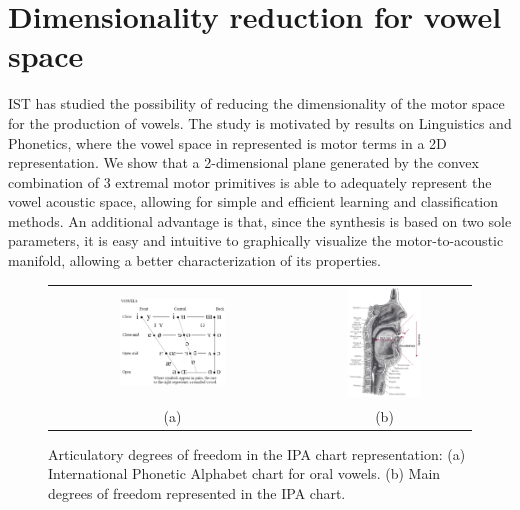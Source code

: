 \section{Dimensionality reduction for vowel space}
IST has studied the possibility of reducing the dimensionality of the
motor space for the production of vowels. The study is motivated by results on Linguistics and
Phonetics, where the vowel space in represented is motor terms in a 2D
representation. We show that a 2-dimensional plane generated by the
convex combination of 3 extremal motor primitives is able to
adequately represent the vowel acoustic space, allowing for simple and
efficient learning and classification methods. An additional advantage
is that, since the synthesis is based on two sole parameters, it is
easy and intuitive to graphically visualize the motor-to-acoustic
manifold, allowing a better characterization of its properties. 

\begin{figure}[!h]
  \centering
\begin{tabular}{cc}
\includegraphics[width=0.45\textwidth]{include/vowels/images/vowels} &
\includegraphics[width=0.45\textwidth]{include/vowels/images/vtdiag} \\
(a) & (b) \\
\end{tabular}
\caption{Articulatory degrees of freedom in the IPA chart
  representation: (a) International Phonetic Alphabet chart for oral
  vowels. (b) Main degrees of freedom represented in the IPA chart.}
\label{fig:ipavowels}
\end{figure}

